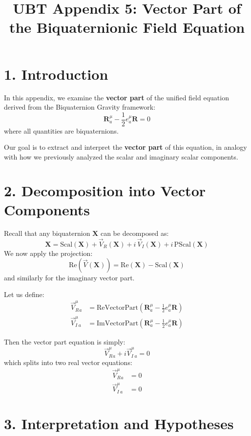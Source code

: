 \documentclass[12pt]{article}
\title{UBT Appendix 5: Vector Part of the Biquaternionic Field Equation}
\author{}
\date{}
\begin{document}
\maketitle

\section*{1. Introduction}

In this appendix, we examine the \textbf{vector part} of the unified field equation derived from the Biquaternion Gravity framework:
\begin{equation}
\mathbf{R}^\mu_a - \frac{1}{2} e^\mu_a \mathbf{R} = 0
\end{equation}
where all quantities are biquaternions.

Our goal is to extract and interpret the \textbf{vector part} of this equation, in analogy with how we previously analyzed the scalar and imaginary scalar components.

\section*{2. Decomposition into Vector Components}

Recall that any biquaternion $\mathbf{X}$ can be decomposed as:
\[
\mathbf{X} = \text{Scal}(\mathbf{X}) + \vec{V}_R(\mathbf{X}) + i \, \vec{V}_I(\mathbf{X}) + i \, \text{PScal}(\mathbf{X})
\]
We now apply the projection:
\[
\text{Re}(\vec{V}(\mathbf{X})) = \text{Re}(\mathbf{X}) - \text{Scal}(\mathbf{X})
\]
and similarly for the imaginary vector part.

Let us define:
\begin{align}
\vec{V}_R^{\mu}_{a} &= \text{ReVectorPart}(\mathbf{R}^{\mu}_{a} - \tfrac{1}{2} e^{\mu}_{a} \mathbf{R}) \\
\vec{V}_I^{\mu}_{a} &= \text{ImVectorPart}(\mathbf{R}^{\mu}_{a} - \tfrac{1}{2} e^{\mu}_{a} \mathbf{R})
\end{align}

Then the vector part equation is simply:
\begin{equation}
\vec{V}_R^{\mu}_{a} + i \vec{V}_I^{\mu}_{a} = 0
\end{equation}
which splits into two real vector equations:
\begin{align}
\vec{V}_R^\mu_a &= 0 \\
\vec{V}_I^\mu_a &= 0
\end{align}

\section*{3. Interpretation and Hypotheses}
\end{document}
